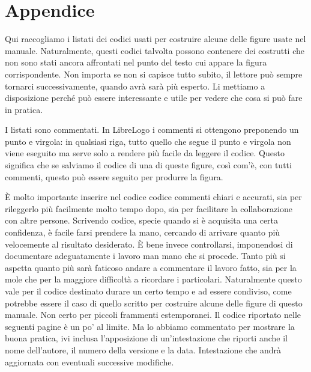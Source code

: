\chapter{Appendice} \label{cap:appendice}

Qui raccogliamo i listati dei codici usati per costruire alcune delle figure usate nel manuale. Naturalmente, questi codici talvolta possono contenere dei costrutti che non sono stati ancora affrontati nel punto del testo cui appare la figura corrispondente. Non importa se non si capisce tutto subito, il lettore può sempre tornarci successivamente, quando avrà sarà più esperto. Li mettiamo a disposizione perché può essere interessante e utile per vedere che cosa si può fare in pratica.

I listati sono commentati. In LibreLogo i commenti si ottengono preponendo un punto e virgola: in qualsiasi riga, tutto quello che segue il punto e virgola non viene eseguito ma serve solo a rendere più facile da leggere il codice. Questo significa che se salviamo il codice di una di queste figure, così com'è, con tutti commenti, questo può essere seguito per produrre la figura. 

È molto importante inserire nel codice codice commenti chiari e accurati, sia per rileggerlo più facilmente molto tempo dopo, sia per facilitare la collaborazione con altre persone. Scrivendo codice, specie quando si è acquisita una certa confidenza, è facile farsi prendere la mano, cercando di arrivare quanto più velocemente al risultato desiderato. È bene invece controllarsi, imponendosi di documentare adeguatamente i lavoro man mano che si procede. Tanto più si aspetta quanto più sarà faticoso andare a commentare il lavoro fatto, sia per la mole che per la maggiore difficoltà a ricordare i particolari. Naturalmente questo vale per il codice destinato durare un certo tempo e ad essere condiviso, come potrebbe essere il caso di quello scritto per costruire alcune delle figure di questo manuale. Non certo per piccoli frammenti estemporanei. Il codice riportato nelle seguenti pagine è un po' al limite. Ma lo abbiamo commentato per mostrare la buona pratica, ivi inclusa l'apposizione di un'intestazione che riporti anche il nome dell'autore, il numero della versione e la data. Intestazione che andrà aggiornata con eventuali successive modifiche.


\vskip 1cm

